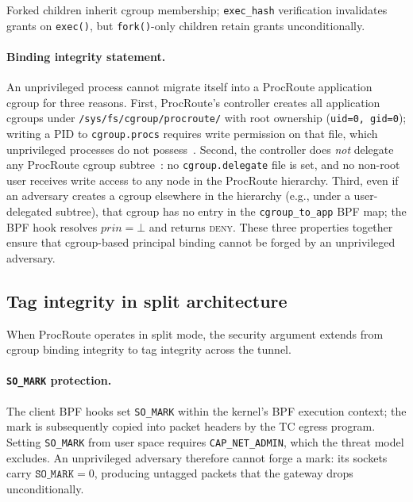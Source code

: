 \documentclass[sigconf]{acmart}
\begin{document}
Forked children inherit cgroup membership; \texttt{exec\_hash}
verification invalidates
grants on \texttt{exec()}, but \texttt{fork()}-only children
retain grants unconditionally.

\paragraph{Binding integrity statement.}
An unprivileged process cannot migrate itself into a ProcRoute
application cgroup for three reasons.
First, ProcRoute's controller creates all application cgroups
under \texttt{/sys/fs/cgroup/procroute/} with root ownership
(\texttt{uid=0, gid=0}); writing a PID to \texttt{cgroup.procs}
requires write permission on that file, which unprivileged
processes do not possess~\cite{kernel_cgroup2}.
Second, the controller does \emph{not} delegate any ProcRoute
cgroup subtree~\cite{kernel_cgroup2_delegation}: no
\texttt{cgroup.delegate} file is set, and no non-root user
receives write access to any node in the ProcRoute hierarchy.
Third, even if an adversary creates a cgroup elsewhere in the
hierarchy (e.g., under a user-delegated subtree), that cgroup
has no entry in the \texttt{cgroup\_to\_app} BPF map; the BPF
hook resolves $\mathit{prin} = \bot$ and returns \textsc{deny}.
These three properties together ensure that cgroup-based principal
binding cannot be forged by an unprivileged adversary.

\subsection{Tag integrity in split architecture}
\label{sec:tag-integrity}

When ProcRoute operates in split mode, the security argument extends
from cgroup binding integrity to tag integrity across the tunnel.

\paragraph{\texttt{SO\_MARK} protection.}
The client BPF hooks set \texttt{SO\_MARK} within the kernel's BPF
execution context; the mark is subsequently copied into packet
headers by the TC egress program.
Setting \texttt{SO\_MARK} from user space requires
\texttt{CAP\_NET\_ADMIN}, which the threat model excludes.
An unprivileged adversary therefore cannot forge a mark: its
sockets carry $\texttt{SO\_MARK} = 0$, producing untagged packets
that the gateway drops unconditionally.
\end{document}

